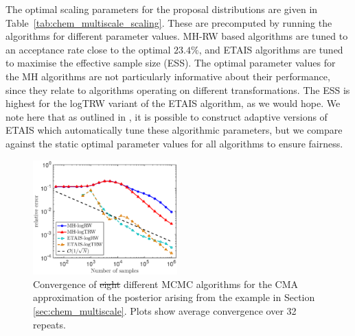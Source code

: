 \documentclass[final]{siamltex}
\newcommand{\edit}[1]{{\color{red} #1}}  %
\providecommand{\DIFadd}[1]{{\protect\color{blue}\uwave{#1}}} %
\providecommand{\DIFdel}[1]{{\protect\color{red}\sout{#1}}}                      %
\providecommand{\DIFaddFL}[1]{\DIFadd{#1}} %
\providecommand{\DIFdelFL}[1]{\DIFdel{#1}} %
\providecommand{\DIFaddbeginFL}{} %
\providecommand{\DIFaddendFL}{} %
\providecommand{\DIFdelbeginFL}{} %
\providecommand{\DIFdelendFL}{} %
\newcommand{\DIFscaledelfig}{0.5}
\newlength{\DIFdelgraphicswidth} %
\newlength{\DIFdelgraphicsheight} %
\newcommand{\DIFaddincludegraphics}[2][]{{\color{blue}\fbox{\DIFOincludegraphics[#1]{#2}}}} %
\newcommand{\DIFdelincludegraphics}[2][]{%
\sbox{\DIFdelgraphicsbox}{\DIFOincludegraphics[#1]{#2}}%
\settoboxwidth{\DIFdelgraphicswidth}{\DIFdelgraphicsbox} %
\settoboxtotalheight{\DIFdelgraphicsheight}{\DIFdelgraphicsbox} %
\scalebox{\DIFscaledelfig}{%
\parbox[b]{\DIFdelgraphicswidth}{\usebox{\DIFdelgraphicsbox}\\[-\baselineskip] \rule{\DIFdelgraphicswidth}{0em}}\llap{\resizebox{\DIFdelgraphicswidth}{\DIFdelgraphicsheight}{%
\setlength{\unitlength}{\DIFdelgraphicswidth}%
\begin{picture}(1,1)%
\thicklines\linethickness{2pt} %
{\color[rgb]{1,0,0}\put(0,0){\framebox(1,1){}}}%
{\color[rgb]{1,0,0}\put(0,0){\line( 1,1){1}}}%
{\color[rgb]{1,0,0}\put(0,1){\line(1,-1){1}}}%
\end{picture}%
}\hspace*{3pt}}} %
} %
\DeclareRobustCommand{\DIFaddbeginFL}{\DIFOaddbeginFL \let\includegraphics\DIFaddincludegraphics} %
\DeclareRobustCommand{\DIFaddendFL}{\DIFOaddendFL \let\includegraphics\DIFOincludegraphics} %
\DeclareRobustCommand{\DIFdelbeginFL}{\DIFOdelbeginFL \let\includegraphics\DIFdelincludegraphics} %
\DeclareRobustCommand{\DIFdelendFL}{\DIFOaddendFL \let\includegraphics\DIFOincludegraphics} %
\begin{document}
The optimal scaling parameters for the proposal distributions are
given in Table~\ref{tab:chem_multiscale_scaling}. These are
precomputed by running the algorithms for different parameter
values. MH-RW based algorithms are tuned to an acceptance rate close
to the optimal $23.4\%$, and ETAIS algorithms are tuned to maximise the
effective sample size (ESS). The optimal parameter values for the MH
algorithms are not particularly informative about their performance,
since they relate to algorithms operating on different
transformations. The ESS is highest for the logTRW variant
of the ETAIS algorithm, as we would hope. We note here that as
outlined in \cite{cotter2015parallel}, it is possible to construct
adaptive versions of ETAIS which automatically tune these algorithmic
parameters, but we compare against the static optimal parameter values
for all algorithms to ensure fairness.

\begin{figure}[!htb]
\centering
\DIFdelbeginFL %
\DIFdelendFL %
\DIFaddbeginFL \includegraphics[width=0.495\textwidth]{"images/Applications/CMA_L2_log_space"}
\DIFaddendFL \caption{Convergence of \DIFdelbeginFL \DIFdelFL{eight }\DIFdelendFL \DIFaddbeginFL \DIFaddFL{four }\DIFaddendFL different MCMC algorithms for the CMA
  approximation of the  posterior arising from the example in Section
  \ref{sec:chem_multiscale}. \DIFaddbeginFL \edit{Plots show average
    convergence over 32 repeats.}\DIFaddendFL }
\label{fig:chem_multiscale_L2}
\end{figure}
\end{document}
